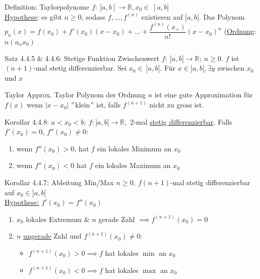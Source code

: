 \documentclass[a4paper,10pt]{article}
\begin{document}
\begin{defbox}
    {Definition: Taylorpolynome}
    $f:\ ]a,b[\longrightarrow \mathbb R, x_0\in \ ]a,b[$
    \\ \underline{Hypothese}: es gibt $n\ge 0$, sodass $f,...,f^{(n)}$ existieren auf $]a,b[$. Das Polynom $p_n(x)=f(x_0)+f'(x_0)(x-x_0)+...+\dfrac{f^{(n)}(x_=)}{n!}(x-x_0)^n$ (\underline{Ordnung}: $n(a_nx_0)$
\end{defbox}
\begin{tbox}
    {Satz 4.4.5 \& 4.4.6: Stetige Funktion Zwischenwert}
    $f:\ ]a,b[\longrightarrow \mathbb R; \ n\ge 0$. $f$ ist $(n+1)$-mal stetig differenzierbar. Sei $x_0\in\ ]a,b[$. Für $x\in]a,b[, \exists y$ zwischen $x_0$ und $x$
\end{tbox}
\begin{tipbox}
    {Taylor Approx.}
    Taylor Polynom der Ordnung $n$ ist eine gute Approximation für $f(x)$ wenn $|x-x_0|$ $"$klein$"$ ist, falls $f^{(n+1)}$ nicht zu gross ist.
\end{tipbox}
\begin{tbox}
    {Korollar 4.4.8: }
    $a<x_0<b;\ f:]a,b[\longrightarrow \mathbb R,$ 2-mal \underline{stetig differenzierbar}. Falls $f'(x_0)=0$, $ f''(x_0) \neq 0$:
    \begin{enumerate}
        \item wenn $f''(x_0)>0$, hat $f$ ein lokales Minimum an $x_0$
        \item wenn $f''(x_0)< 0$ hat $f$ ein lokales Maximum an $x_0$
    \end{enumerate}
\end{tbox}
\begin{tbox}
    {Korollar 4.4.7: Ableitung Min/Max}
    $n\ge 0,\ f(n+1)$-mal stetig differenzierbar auf $x_0\in ]a,b[$
    \\ \underline{Hypothese:} $f'(x_0)=f''(x_0)$
    \begin{enumerate}
        \item $x_0$ lokales Extremum \& $n$ gerade Zahl $\implies f^{(n+1)}(x_0)=0$
        \item $n$ \underline{ungerade} Zahl und $f^{(n+1)}(x_0)\neq 0$:
        \begin{itemize}
            \item $f^{(n+1)}(x_0)>0 \implies f$ hat lokales \underline{$\min$} an $x_0$
            \item $f^{(n+1)}(x_0)<0 \implies f$ hat lokales \underline{$\max$} an $x_0$ 
        \end{itemize}
    \end{enumerate}
\end{tbox}
\end{document}

